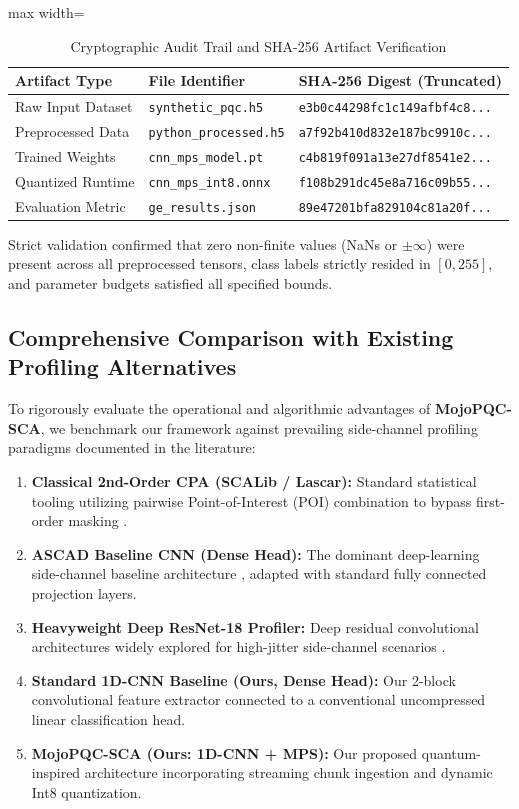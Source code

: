 \documentclass[letterpaper]{article}
\begin{document}
\begin{table}[htbp]
\centering
\caption{Cryptographic Audit Trail and SHA-256 Artifact Verification}
\label{tab:audit_manifest}
\begin{adjustbox}{max width=\linewidth}
\small
\begin{tabular}{|l|l|l|}
\hline
\textbf{Artifact Type} & \textbf{File Identifier} & \textbf{SHA-256 Digest (Truncated)} \\ 
\hline
Raw Input Dataset & \texttt{synthetic\_pqc.h5} & \texttt{e3b0c44298fc1c149afbf4c8...} \\
Preprocessed Data & \texttt{python\_processed.h5} & \texttt{a7f92b410d832e187bc9910c...} \\
Trained Weights & \texttt{cnn\_mps\_model.pt} & \texttt{c4b819f091a13e27df8541e2...} \\
Quantized Runtime & \texttt{cnn\_mps\_int8.onnx} & \texttt{f108b291dc45e8a716c09b55...} \\
Evaluation Metric & \texttt{ge\_results.json} & \texttt{89e47201bfa829104c81a20f...} \\
\hline
\end{tabular}
\end{adjustbox}
\end{table}

Strict validation confirmed that zero non-finite values (NaNs or $\pm \infty$) were present across all preprocessed tensors, class labels strictly resided in $[0, 255]$, and parameter budgets satisfied all specified bounds.

\subsection{Comprehensive Comparison with Existing Profiling Alternatives}
To rigorously evaluate the operational and algorithmic advantages of \textbf{MojoPQC-SCA}, we benchmark our framework against prevailing side-channel profiling paradigms documented in the literature:
\begin{enumerate}
    \item \textbf{Classical 2nd-Order CPA (SCALib / Lascar):} Standard statistical tooling utilizing pairwise Point-of-Interest (POI) combination to bypass first-order masking \cite{brier2004correlation,bronchain2020side}.
    \item \textbf{ASCAD Baseline CNN (Dense Head):} The dominant deep-learning side-channel baseline architecture \cite{benadjila2020deep,ascaddatabase2018}, adapted with standard fully connected projection layers.
    \item \textbf{Heavyweight Deep ResNet-18 Profiler:} Deep residual convolutional architectures widely explored for high-jitter side-channel scenarios \cite{zaid2020methodology,wu2022removing,picek2023deep}.
    \item \textbf{Standard 1D-CNN Baseline (Ours, Dense Head):} Our 2-block convolutional feature extractor connected to a conventional uncompressed linear classification head.
    \item \textbf{MojoPQC-SCA (Ours: 1D-CNN + MPS):} Our proposed quantum-inspired architecture incorporating streaming chunk ingestion and dynamic Int8 quantization.
\end{enumerate}
\end{document}

